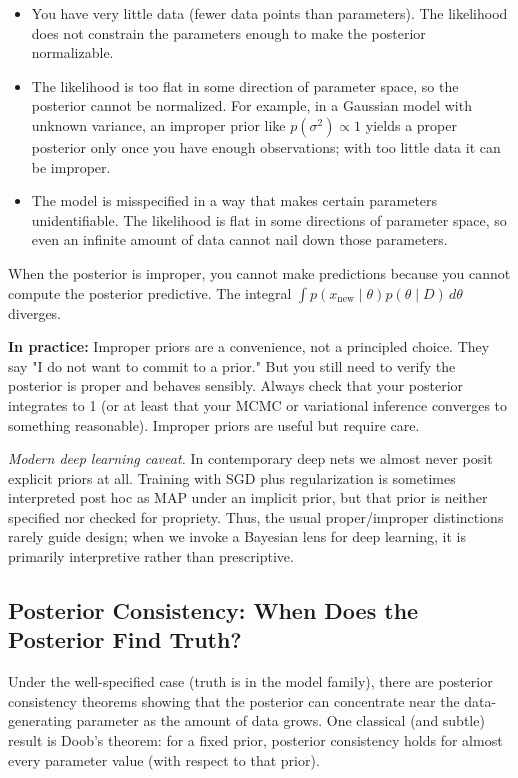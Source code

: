 \begin{itemize}
\item You have very little data (fewer data points than parameters). The likelihood does not constrain the parameters enough to make the posterior normalizable.

\item The likelihood is too flat in some direction of parameter space, so the posterior cannot be normalized. For example, in a Gaussian model with unknown variance, an improper prior like $p(\sigma^2)\propto 1$ yields a proper posterior only once you have enough observations; with too little data it can be improper.

\item The model is misspecified in a way that makes certain parameters unidentifiable. The likelihood is flat in some directions of parameter space, so even an infinite amount of data cannot nail down those parameters.
\end{itemize}

When the posterior is improper, you cannot make predictions because you cannot compute the posterior predictive. The integral $\int p(x_{\text{new}} \mid \theta) p(\theta \mid D) \, d\theta$ diverges.

\textbf{In practice:} Improper priors are a convenience, not a principled choice. They say "I do not want to commit to a prior." But you still need to verify the posterior is proper and behaves sensibly. Always check that your posterior integrates to 1 (or at least that your MCMC or variational inference converges to something reasonable). Improper priors are useful but require care.



\vspace{0.5em}
\noindent\textit{Modern deep learning caveat.} In contemporary deep nets we almost never posit explicit priors at all. Training with SGD plus regularization is sometimes interpreted post hoc as MAP under an implicit prior, but that prior is neither specified nor checked for propriety. Thus, the usual proper/improper distinctions rarely guide design; when we invoke a Bayesian lens for deep learning, it is primarily interpretive rather than prescriptive.


\subsection{Posterior Consistency: When Does the Posterior Find Truth?}

Under the well-specified case (truth is in the model family), there are posterior consistency theorems showing that the posterior can concentrate near the data-generating parameter as the amount of data grows. One classical (and subtle) result is Doob's theorem: for a fixed prior, posterior consistency holds for almost every parameter value (with respect to that prior).


